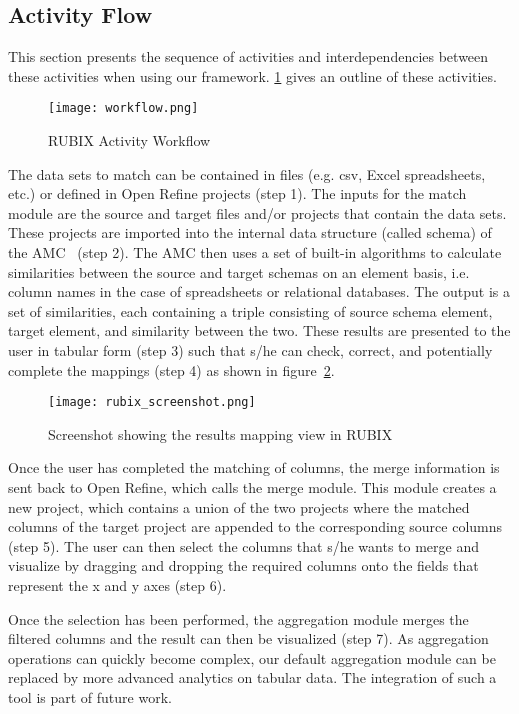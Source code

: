 \subsection{Activity Flow}
This section presents the sequence of activities and interdependencies between these activities when using our framework. \ref{fig:Activity_workflow} gives an outline of these activities.

\begin{figure}[ht!]
  \centering
    \texttt{[image: workflow.png]}
  \caption{RUBIX Activity Workflow}
  \label{fig:Activity_workflow}
\end{figure}

The data sets to match can be contained in files (e.g. csv, Excel spreadsheets, etc.) or defined in Open Refine projects (step 1). The inputs for the match module are the source and target files and/or projects that contain the data sets. These projects are imported into the internal data structure (called schema) of the AMC~\cite{Peukert:ICDE:11} (step 2). The AMC then uses a set of built-in algorithms to calculate similarities between the source and target schemas on an element basis, i.e. column names in the case of spreadsheets or relational databases. The output is a set of similarities, each containing a triple consisting of source schema element, target element, and similarity between the two. These results are presented to the user in tabular form (step 3) such that s/he can check, correct, and potentially complete the mappings (step 4) as shown in figure~\ref{fig:rubix_screenshot}.

\begin{figure}[ht!]
  \centering
    \texttt{[image: rubix\_screenshot.png]}
  \caption{Screenshot showing the results mapping view in RUBIX}
  \label{fig:rubix_screenshot}
\end{figure}

Once the user has completed the matching of columns, the merge information is sent back to Open Refine, which calls the merge module. This module creates a new project, which contains a union of the two projects where the matched columns of the target project are appended to the corresponding source columns (step 5). The user can then select the columns that s/he wants to merge and visualize by dragging and dropping the required columns onto the fields that represent the x and y axes (step 6).

Once the selection has been performed, the aggregation module merges the filtered columns and the result can then be visualized (step 7). As aggregation operations can quickly become complex, our default aggregation module can be replaced by more advanced analytics on tabular data. The integration of such a tool is part of future work.

